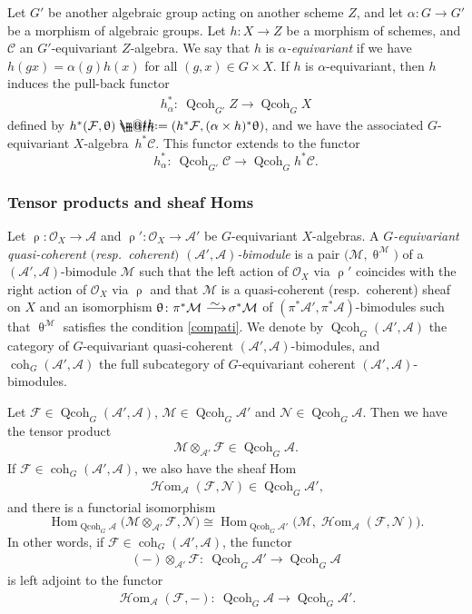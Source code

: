 \documentclass[11pt]{article}
\makeatletter
\numberwithin{equation}{section}
\newcommand*{\defeq}{\mathrel{\rlap{%
 \raisebox{0.3ex}{$\m@th\cdot$}}%
 \raisebox{-0.3ex}{$\m@th\cdot$}}%
 =}
\numberwithin{equation}{section}
\newcommand{\Hom}{\operatorname{Hom}}
\newcommand{\cHom}{\operatorname{{\mathcal H}om}}
\newcommand{\coh}{\operatorname{coh}}
\newcommand{\Qcoh}{\operatorname{Qcoh}}
\newcommand{\cA}{\mathcal{A}}
\newcommand{\cC}{\mathcal{C}}
\newcommand{\cF}{\mathcal{F}}
\newcommand{\cM}{\mathcal{M}}
\newcommand{\cN}{\mathcal{N}}
\newcommand{\cO}{\mathcal{O}}
\newcommand{\simto}{\,\,\,\,\raisebox{4pt}{$\sim$}{\kern -1.1em \longrightarrow}\,}
\makeatother
\begin{document}
 Let $G'$ be another algebraic group acting on another scheme $Z$, and let $\alpha\colon G\to G'$ be a morphism of algebraic groups. Let $h\colon X\to Z$ be a morphism of schemes, and $\cC$ an $G'$-equivariant $Z$-algebra. We say that $h$ is {\it $\alpha$-equivariant} if we have $h(g x)=\alpha(g)h(x)$ for all $(g,x)\in G\times X$. If $h$ is $\alpha$-equivariant, then $h$ induces the pull-back functor
\begin{gather*}
h^*_{\alpha}\colon\ \Qcoh_{G'}Z\to \Qcoh_GX
\end{gather*}
defined by $h^*(\cF,\uptheta)\defeq(h^*\cF, (\alpha\times h)^*\uptheta)$, and we have
 the associated $G$-equivariant $X$-alge\-bra~$h^*\cC$. This functor extends to
the functor
\begin{equation*}%
h^*_{\alpha}\colon\ \Qcoh_{G'}\cC\to \Qcoh_Gh^*\cC.
\end{equation*}

\subsubsection{Tensor products and sheaf Homs}

Let $\uprho\colon\cO_{X}\to\cA$ and $\uprho'\colon\cO_{X}\to\cA'$ be $G$-equivariant $X$-algebras. A {\it $G$-equivariant quasi-coherent $($resp.\ coherent$)$ $(\cA',\cA)$-bimodule} is a pair $\big(\cM,\uptheta^{\cM}\big)$ of a $(\cA',\cA)$-bimodule $\cM$ such that the left action of $\cO_{X}$ via $\uprho'$ coincides with the right action of $\cO_{X}$ via $\uprho$ and that $\cM$ is a quasi-coherent (resp.\ coherent) sheaf on $X$ and an isomorphism $\uptheta\colon \pi^*\cM\simto\sigma^*\cM$ of $(\pi^*\cA',\pi^*\cA)$-bimodules such that $\uptheta^{\cM}$ satisfies the condition \eqref{compati}.
 We denote by
$\Qcoh_G(\cA',\cA)$ the category of $G$-equivariant quasi-coherent $(\cA',\cA)$-bimodules, and $\coh_G(\cA',\cA)$ the full subcategory of $G$-equivariant coherent $(\cA',\cA)$-bimodules.


Let $\cF\in \Qcoh_G(\cA',\cA)$, $\cM\in\Qcoh_G\cA'$ and $\cN\in \Qcoh_G\cA$. Then we have the tensor product
\begin{gather*}
\cM\otimes_{\cA'}\cF\in \Qcoh_G\cA.
\end{gather*}
If $\cF\in \coh_G(\cA',\cA)$, we also have the sheaf Hom
\begin{gather*}
\cHom_{\cA}(\cF,\cN)\in \Qcoh_G\cA',
\end{gather*}
and there is a functorial isomorphism
\begin{equation*}%
\Hom_{\Qcoh_G\cA}\big(\cM\otimes_{\cA'}\cF,\cN\big)\cong \Hom_{\Qcoh_G\cA'}\big(\cM,\cHom_{\cA}(\cF,\cN)\big).
\end{equation*}
In other words, if $\cF\in \coh_G(\cA',\cA)$, the functor
\begin{gather*}
(-)\otimes_{\cA'}\cF\colon\ \Qcoh_G\cA'\to\Qcoh_G\cA
\end{gather*}
is left adjoint to the functor
\begin{gather*}
\cHom_{\cA}(\cF,-)\colon\ \Qcoh_G\cA\to\Qcoh_G \cA'.
\end{gather*}
\end{document}
